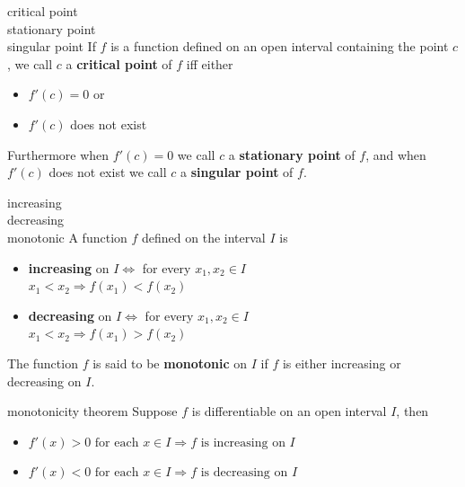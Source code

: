 \documentclass[avery5371,grid]{flashcards}
\begin{document}
\begin{flashcard}[Definition]{critical point\\stationary point\\singular point}
If $f$ is a function defined on an open interval containing the point $c$,
we call $c$ a \textbf{critical point} of $f$ iff either
\begin{itemize}
\item $f'(c) = 0$ or
\item $f'(c)$ does not exist 
\end{itemize}
Furthermore when $f'(c)=0$ we call $c$ a \textbf{stationary point} of $f$,
and when $f'(c)$ does not exist we call $c$ a \textbf{singular point}
of $f$.
\end{flashcard}

\begin{flashcard}[Definition]{increasing\\decreasing\\monotonic}
A function $f$ defined on the interval $I$ is
\begin{itemize}
\item \textbf{increasing} on $I \Leftrightarrow$
for every $x_{1},x_{2}\in I$\\
$x_{1}<x_{2}\Rightarrow f(x_{1})<f(x_{2})$
\item  \textbf{decreasing} on $I \Leftrightarrow$
for every $x_{1},x_{2}\in I$\\
$x_{1}<x_{2}\Rightarrow f(x_{1})>f(x_{2})$
\end{itemize}
The function $f$ is said to be \textbf{monotonic} on $I$ if $f$
is either increasing or decreasing on $I$.
\end{flashcard}

\begin{flashcard}[Theorem]{monotonicity theorem}
Suppose $f$ is differentiable on an open interval $I$, then
\begin{itemize}
\item $f'(x) > 0 \text{ for each } x \in I \Rightarrow f \text{ is increasing on } I$ 
\item $f'(x) < 0 \text{ for each } x \in I \Rightarrow f \text{ is decreasing on } I$ 
\end{itemize}
\end{flashcard}
\end{document}
